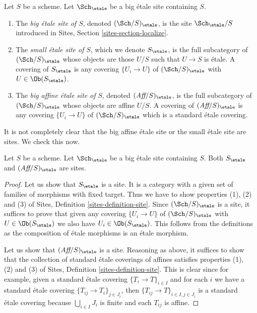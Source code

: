 \begin{definition}
\label{definition-big-small-etale}
Let $S$ be a scheme. Let $\Sch_\etale$ be a big \'etale
site containing $S$.
\begin{enumerate}
\item The {\it big \'etale site of $S$}, denoted
$(\Sch/S)_\etale$, is the site
$\Sch_\etale/S$ introduced in
Sites, Section \ref{sites-section-localize}.
\item The {\it small \'etale site of $S$}, which we denote
$S_\etale$, is the full subcategory of
$(\Sch/S)_\etale$
whose objects are those $U/S$ such that $U \to S$ is \'etale.
A covering of $S_\etale$ is any covering $\{U_i \to U\}$ of
$(\Sch/S)_\etale$ with $U \in \Ob(S_\etale)$.
\item The {\it big affine \'etale site of $S$}, denoted
$(\textit{Aff}/S)_\etale$, is the full subcategory of
$(\Sch/S)_\etale$ whose objects are affine $U/S$.
A covering of $(\textit{Aff}/S)_\etale$ is any covering
$\{U_i \to U\}$ of $(\Sch/S)_\etale$ which is a
standard \'etale covering.
\end{enumerate}
\end{definition}

\noindent
It is not completely clear that
the big affine \'etale site or the small \'etale site are sites.
We check this now.

\begin{lemma}
\label{lemma-verify-site-etale}
Let $S$ be a scheme. Let $\Sch_\etale$ be a big \'etale
site containing $S$.
Both $S_\etale$ and $(\textit{Aff}/S)_\etale$ are sites.
\end{lemma}

\begin{proof}
Let us show that $S_\etale$ is a site. It is a category with a
given set of families of morphisms with fixed target. Thus we
have to show properties (1), (2) and (3) of
Sites, Definition \ref{sites-definition-site}.
Since $(\Sch/S)_\etale$ is a site, it suffices to prove
that given any covering $\{U_i \to U\}$ of $(\Sch/S)_\etale$
with $U \in \Ob(S_\etale)$ we also have
$U_i \in \Ob(S_\etale)$.
This follows from the definitions as the composition of \'etale morphisms
is an \'etale morphism.

\medskip\noindent
Let us show that $(\textit{Aff}/S)_\etale$ is a site.
Reasoning as above, it suffices to show that the collection
of standard \'etale coverings of affines satisfies properties
(1), (2) and (3) of
Sites, Definition \ref{sites-definition-site}.
This is clear since for example, given a standard \'etale
covering $\{T_i \to T\}_{i\in I}$ and for each
$i$ we have a standard \'etale covering $\{T_{ij} \to T_i\}_{j\in J_i}$, then
$\{T_{ij} \to T\}_{i \in I, j\in J_i}$ is a standard \'etale covering
because $\bigcup_{i\in I} J_i$ is finite and each $T_{ij}$ is affine.
\end{proof}

